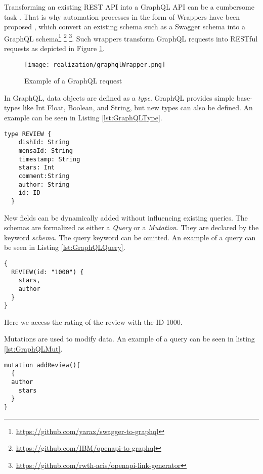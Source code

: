 Transforming an existing REST API into a GraphQL API can be a cumbersome task \cite{WCL18}. That is why automation processes in the form of Wrappers have been proposed \cite{KKK20}, which convert an existing schema such as a Swagger schema into a GraphQL schema\footnote{\url{https://github.com/yarax/swagger-to-graphql}} \footnote{\url{https://github.com/IBM/openapi-to-graphql}} \footnote{\url{https://github.com/rwth-acis/openapi-link-generator}}.   Such wrappers transform GraphQL requests into RESTful requests as depicted in Figure \ref{fig:graphqlWrapper}.
\begin{figure}[H]
    \centering
    \texttt{[image: realization/graphqlWrapper.png]}
    \caption{Example of a GraphQL request}
    \label{fig:graphqlWrapper}
\end{figure}

In GraphQL, data objects are defined as a \emph{type}. GraphQL provides simple base-types like Int Float, Boolean, and String, but new types can also be defined. An example can be seen in Listing \ref{lst:GraphQLType}.
\begin{lstlisting}[caption={Example of a GraphQL schema},captionpos=b,label={lst:GraphQLType}]
  type REVIEW { 
    dishId: String 
    mensaId: String 
    timestamp: String 
    stars: Int 
    comment:String
    author: String 
    id: ID 
  }
\end{lstlisting}
New fields can be dynamically added without influencing existing queries. The schemas are formalized as either a \emph{Query} or a \emph{Mutation}. They are declared by the keyword \emph{schema}. The query keyword can be omitted. An example of a query can be seen in Listing \ref{lst:GraphQLQuery}.
\begin{lstlisting}[caption={Example of a GraphQL Query},captionpos=b,label={lst:GraphQLQuery}]
{
  REVIEW(id: "1000") {
    stars,
    author
  }
}
\end{lstlisting}
Here we access the rating of the review with the ID 1000.

Mutations are used to modify data. An example of a query can be seen in listing \ref{lst:GraphQLMut}.
\begin{lstlisting}[caption={Example of a GraphQL Mutation},captionpos=b,label={lst:GraphQLMut}]
mutation addReview(){
  {
  author
	stars 
  }
}
\end{lstlisting}

